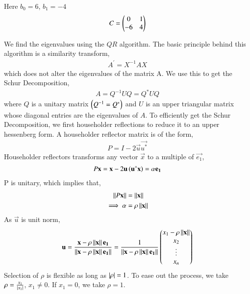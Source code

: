 \documentclass[journal]{IEEEtran}
\begin{document}
Here $b_0 = 6$, $b_1 = -4$
\begin{align}
    C = \begin{pmatrix}0&1 \\ -6&4\end{pmatrix}
\end{align}

We find the eigenvalues using the $QR$ algorithm. The basic principle behind this algorithm is a similarity transform,
\begin{align}
  A^{\prime} = X^{-1}AX
\end{align}
which does not alter the eigenvalues of the matrix A. 
\newline
We use this to get the Schur Decomposition,
\begin{align}
  A = Q^{-1}UQ = Q^{\ast}UQ
\end{align}
where $Q$ is a unitary matrix $\left(Q^{-1} = Q^{\ast}\right)$ and $U$ is an upper triangular matrix whose diagonal entries are the eigenvalues of $A$.
\newline
To efficiently get the Schur Decomposition, we first householder reflections to reduce it to an upper hessenberg form.
\newline
A householder reflector matrix is of the form,
\begin{align}
  P = I - 2\vec{u}\vec{u^{\ast}}
\end{align}
Householder reflectors transforms any vector $\vec{x}$ to a multiple of $\vec{e_1}$,
\begin{align}
  P\mathbf{x} = \mathbf{x} - 2\mathbf{u}\left(\mathbf{u^{\ast}}\mathbf{x}\right) = \alpha \mathbf{e_1}
\end{align}
P is unitary, which implies that,
\begin{align}
  \left\lVert P\mathbf{x}\right\rVert &= \left\lVert\mathbf{x}\right\rVert\\
  \implies \alpha &= \rho\left\lVert\mathbf{x}\right\rVert\\
\end{align}
As $\vec{u}$ is unit norm,
\begin{align}
  \mathbf{u} = \frac{\mathbf{x} - \rho\left\lVert\mathbf{x}\right\rVert\mathbf{e_1}}{\left\lVert\mathbf{x} - \rho\left\lVert\mathbf{x}\right\rVert\mathbf{e_1}\right\rVert} = \frac{1}{\left\lVert\mathbf{x} - \rho\left\lVert\mathbf{x}\right\rVert\mathbf{e_1}\right\rVert} \begin{pmatrix} x_1 - \rho\left\lVert\mathbf{x}\right\rVert\\x_2\\\vdots\\x_n\end{pmatrix}
\end{align}
Selection of $\rho$ is flexible as long as $\left\vert\rho\right\vert = 1$. To ease out the process, we take $\rho = \frac{x_1}{\left\vert x_1\right\vert}$, $x_1 \neq 0$. If $x_1 = 0$, we take $\rho = 1$.
\end{document}
